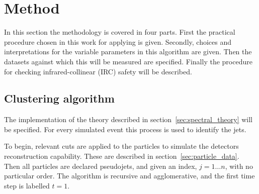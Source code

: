 \section{Method}
In this section the methodology is covered in four parts.
First the practical procedure chosen in this work for applying \spectral{} is given.
Secondly, choices and interpretations for the variable parameters in this algorithm are given.
Then the datasets against which this will be measured are specified.
Finally the procedure for checking infrared-collinear (IRC) safety will be described.


\subsection{Clustering algorithm}\label{sec:spectralmethodalgo}
    The implementation of the theory described in section~\ref{sec:spectral_theory} will be specified.
    For every simulated event this process is used to identify the jets.

    To begin, relevant cuts are applied to the particles to simulate the detectors reconstruction capability.
    These are described in section~\ref{sec:particle_data}.
    Then all particles are declared pseudojets, and given an index, \(j = 1 \dots n\), with no particular order.
    The algorithm is recursive and agglomerative, and the first time step is labelled \(t=1\).

